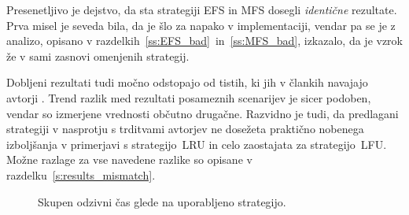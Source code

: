 \documentclass[a4paper, 12pt]{book}
\begin{document}
Presenetljivo je dejstvo, da sta strategiji EFS in MFS dosegli
\textit{identične} rezultate. Prva misel je seveda bila, da je šlo za napako v
implementaciji, vendar pa se je z analizo, opisano v
razdelkih~\ref{ss:EFS_bad}~in~\ref{ss:MFS_bad},
izkazalo, da je vzrok že v sami zasnovi omenjenih strategij.

Dobljeni rezultati tudi močno odstopajo od tistih, ki jih v člankih
navajajo avtorji \cite{efs2011,mfs2012}. Trend razlik med rezultati posameznih
scenarijev je sicer podoben, vendar so izmerjene vrednosti občutno drugačne.
Razvidno je tudi, da predlagani strategiji v nasprotju s trditvami avtorjev ne
dosežeta praktično nobenega izboljšanja v primerjavi s strategijo~LRU in celo
zaostajata za strategijo~LFU. Možne razlage za vse navedene razlike so opisane v
razdelku~\ref{s:results_mismatch}.

\begin{figure}

\caption{Skupen odzivni čas glede na uporabljeno strategijo.}
\label{hist_rsp_t}
\end{figure}
\end{document}
